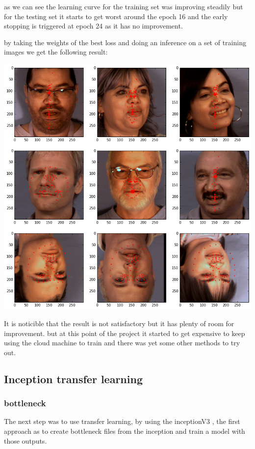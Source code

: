 \documentclass[11pt]{article}
\begin{document}
as we can see the learning curve for the training set was improving steadily
but for the testing set it starts to get worst  around the epoch 16 and the
early stopping is triggered at epoch 24 as it has no improvement.

by taking the weights of the best loss and doing an inference on a set of
training images we get the following result: 

\begin{center}
\includegraphics[width=.9\linewidth]{./images/mymodelTest.png}
\end{center}

It is noticible that the result is not satisfactory but it has plenty of room
for improvement. but at this point of the project it started to get expensive
to keep using the cloud machine to train and there was yet some other methods
to try out.  

\subsection{Inception transfer learning}
\label{sec:org439d68d}

\subsubsection{bottleneck}
\label{sec:org2909d33}

The next step was to use transfer learning, by using the inceptionV3
\cite{szegedy2016rethinking}, the first approach as to create bottleneck files
from the inception and train a model with those outputs.
\end{document}
